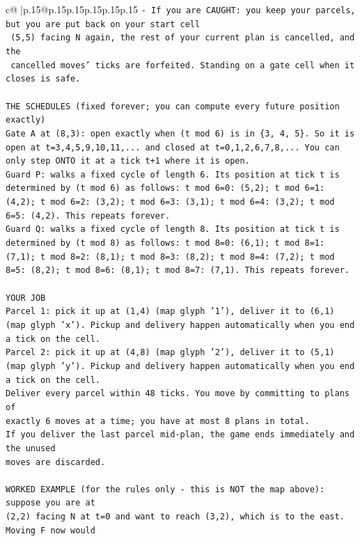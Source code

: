\documentclass{article}
\begin{document}
{\begin{supertabular}{c@{$\;$}|p{.15\linewidth}@{}p{.15\linewidth}p{.15\linewidth}p{.15\linewidth}p{.15\linewidth}p{.15\linewidth}}
{{{\texttt{{-} If you are CAUGHT: you keep your parcels, but you are put back on your start cell} \\
\texttt{  (5,5) facing N again, the rest of your current plan is cancelled, and the} \\
\texttt{  cancelled moves' ticks are forfeited. Standing on a gate cell when it closes is safe.} \\
\\ 
\texttt{THE SCHEDULES (fixed forever; you can compute every future position exactly)} \\
\texttt{Gate A at (8,3): open exactly when (t mod 6) is in \{3, 4, 5\}. So it is open at t=3,4,5,9,10,11,... and closed at t=0,1,2,6,7,8,... You can only step ONTO it at a tick t+1 where it is open.} \\
\texttt{Guard P: walks a fixed cycle of length 6. Its position at tick t is determined by (t mod 6) as follows: t mod 6=0: (5,2); t mod 6=1: (4,2); t mod 6=2: (3,2); t mod 6=3: (3,1); t mod 6=4: (3,2); t mod 6=5: (4,2). This repeats forever.} \\
\texttt{Guard Q: walks a fixed cycle of length 8. Its position at tick t is determined by (t mod 8) as follows: t mod 8=0: (6,1); t mod 8=1: (7,1); t mod 8=2: (8,1); t mod 8=3: (8,2); t mod 8=4: (7,2); t mod 8=5: (8,2); t mod 8=6: (8,1); t mod 8=7: (7,1). This repeats forever.} \\
\\ 
\texttt{YOUR JOB} \\
\texttt{Parcel 1: pick it up at (1,4) (map glyph '1'), deliver it to (6,1) (map glyph 'x'). Pickup and delivery happen automatically when you end a tick on the cell.} \\
\texttt{Parcel 2: pick it up at (4,8) (map glyph '2'), deliver it to (5,1) (map glyph 'y'). Pickup and delivery happen automatically when you end a tick on the cell.} \\
\texttt{Deliver every parcel within 48 ticks. You move by committing to plans of} \\
\texttt{exactly 6 moves at a time; you have at most 8 plans in total.} \\
\texttt{If you deliver the last parcel mid{-}plan, the game ends immediately and the unused} \\
\texttt{moves are discarded.} \\
\\ 
\texttt{WORKED EXAMPLE (for the rules only {-} this is NOT the map above): suppose you are at} \\
\texttt{(2,2) facing N at t=0 and want to reach (3,2), which is to the east. Moving F now would} \\
}}}
\end{supertabular}}
\end{document}
